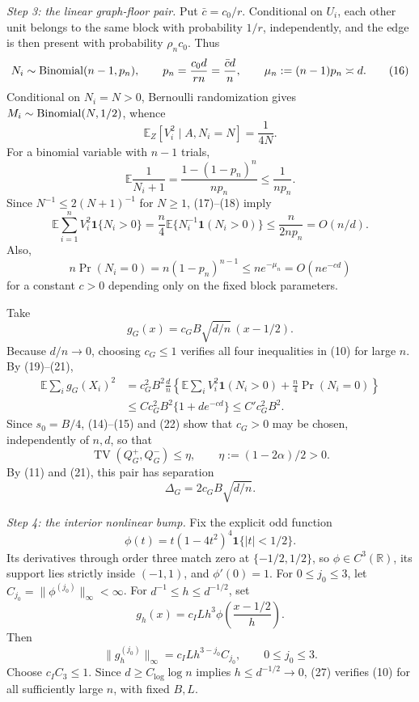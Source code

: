 \textit{Step 3: the linear graph-floor pair.}
Put \(\bar c=c_0/r\).  Conditional on \(U_i\), each other unit belongs to the same block with probability \(1/r\), independently, and the edge is then present with probability \(\rho_nc_0\).  Thus
\[
 N_i\sim{\rm Binomial}(n-1,p_n),
 \qquad p_n=\frac{c_0d}{rn}=\frac{\bar c d}{n},
 \qquad \mu_n:=(n-1)p_n\asymp d.
\tag{16}
\]
Conditional on \(N_i=N>0\), Bernoulli randomization gives \(M_i\sim{\rm Binomial}(N,1/2)\), whence
\[
 \mathbb E_Z[V_i^2\mid A,N_i=N]=\frac1{4N}.
\tag{17}
\]
For a binomial variable with \(n-1\) trials,
\[
 \mathbb E\frac1{N_i+1}
 =\frac{1-(1-p_n)^n}{np_n}\leq\frac1{np_n}.
\tag{18}
\]
Since \(N^{-1}\leq2(N+1)^{-1}\) for \(N\geq1\), (17)--(18) imply
\[
 \mathbb E\sum_{i=1}^nV_i^2\mathbf 1\{N_i>0\}
 =\frac n4\mathbb E\{N_i^{-1}\mathbf 1(N_i>0)\}
 \leq\frac{n}{2np_n}=O(n/d).
\tag{19}
\]
Also,
\[
 n\Pr(N_i=0)=n(1-p_n)^{n-1}
 \leq n e^{-\mu_n}=O(ne^{-c d})
\tag{20}
\]
for a constant \(c>0\) depending only on the fixed block parameters.

Take
\[
 g_G(x)=c_GB\sqrt{d/n}\,(x-1/2).
\tag{21}
\]
Because \(d/n\to0\), choosing \(c_G\leq1\) verifies all four inequalities in (10) for large \(n\).  By (19)--(21),
\[
 \begin{aligned}
 \mathbb E\sum_i g_G(X_i)^2
 &=c_G^2B^2\frac dn
 \left\{\mathbb E\sum_iV_i^2\mathbf 1(N_i>0)
       +\frac n4\Pr(N_i=0)\right\}\\
 &\leq Cc_G^2B^2\{1+d e^{-cd}\}\leq C'c_G^2B^2.
 \end{aligned}
\tag{22}
\]
Since \(s_0=B/4\), (14)--(15) and (22) show that \(c_G>0\) may be chosen, independently of \(n,d\), so that
\[
 \operatorname{TV}(Q_G^+,Q_G^-)\leq\eta,
 \qquad \eta:=(1-2\alpha)/2>0.
\tag{23}
\]
By (11) and (21), this pair has separation
\[
 \Delta_G=2c_GB\sqrt{d/n}.
\tag{24}
\]

\textit{Step 4: the interior nonlinear bump.}
Fix the explicit odd function
\[
 \phi(t)=t(1-4t^2)^4\mathbf 1\{|t|<1/2\}.
\tag{25}
\]
Its derivatives through order three match zero at \(\{-1/2,1/2\}\), so \(\phi\in C^3(\mathbb R)\), its support lies strictly inside \((-1,1)\), and \(\phi'(0)=1\).  For \(0\leq j_0\leq3\), let \(C_{j_0}=\|\phi^{(j_0)}\|_\infty<\infty\).  For \(d^{-1}\leq h\leq d^{-1/2}\), set
\[
 g_h(x)=c_ILh^3\phi\!\left(\frac{x-1/2}{h}\right).
\tag{26}
\]
Then
\[
 \|g_h^{(j_0)}\|_\infty=c_ILh^{3-j_0}C_{j_0},
 \qquad 0\leq j_0\leq3.
\tag{27}
\]
Choose \(c_I C_3\leq1\).  Since \(d\geq C_{\log}\log n\) implies \(h\leq d^{-1/2}\to0\), (27) verifies (10) for all sufficiently large \(n\), with fixed \(B,L\).

